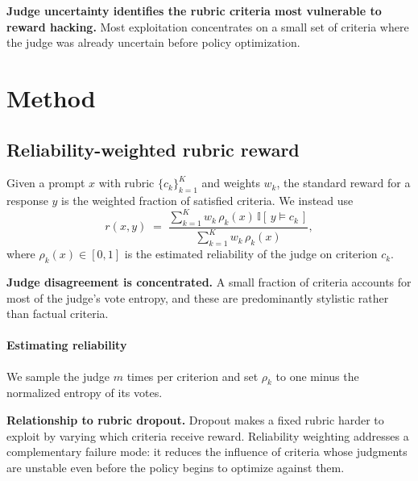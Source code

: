\documentclass[palette=navy,titlestyle=rigorous,titlealign=center]{inkpaper}
\begin{document}
\begin{takeaway}[label=tk:main]
\textbf{Judge uncertainty identifies the rubric criteria most vulnerable to
reward hacking.} Most exploitation concentrates on a small set of criteria
where the judge was already uncertain before policy optimization.
\end{takeaway}

\section{Method}

\subsection{Reliability-weighted rubric reward}

Given a prompt $x$ with rubric $\{c_k\}_{k=1}^{K}$ and weights $w_k$, the
standard reward for a response $y$ is the weighted fraction of satisfied
criteria. We instead use
\begin{equation}
  r(x, y) \;=\; \frac{\sum_{k=1}^{K} w_k\,\rho_k(x)\,\mathbb{I}[\,y \models c_k\,]}
                    {\sum_{k=1}^{K} w_k\,\rho_k(x)},
\end{equation}
where $\rho_k(x) \in [0,1]$ is the estimated reliability of the judge on
criterion $c_k$.

\begin{observation}
\textbf{Judge disagreement is concentrated.} A small fraction of criteria
accounts for most of the judge's vote entropy, and these are predominantly
stylistic rather than factual criteria.
\end{observation}

\paragraph{Estimating reliability} We sample the judge $m$ times per
criterion and set $\rho_k$ to one minus the normalized entropy of its votes.

\begin{discussion}
\textbf{Relationship to rubric dropout.} Dropout makes a fixed rubric harder
to exploit by varying which criteria receive reward. Reliability weighting
addresses a complementary failure mode: it reduces the influence of criteria
whose judgments are unstable even before the policy begins to optimize
against them.
\end{discussion}
\end{document}
